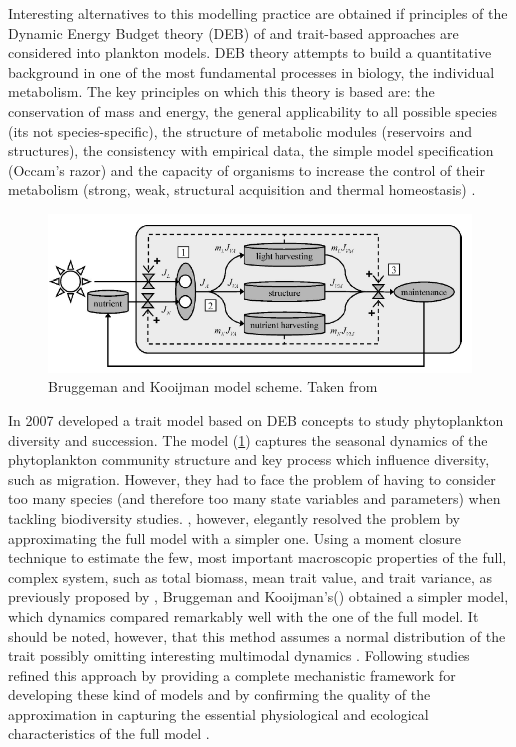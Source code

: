 Interesting alternatives to this modelling practice are obtained if principles of the Dynamic Energy Budget theory (DEB) of \citet{Kooijman2009} and trait-based approaches are considered into plankton models. DEB theory attempts to build a quantitative background in one of the most fundamental processes in biology, the individual metabolism. The key principles on which this theory is based are: the conservation of mass and energy, the general applicability to all possible species (its not species-specific), the structure of metabolic modules (reservoirs and structures), the consistency with empirical data, the simple model specification (Occam's razor) and the capacity of organisms to increase the control of their metabolism (strong, weak, structural acquisition and thermal homeostasis) \citep{Sousa2010}.  

\begin{figure}
\centering
\includegraphics[trim = 0mm 0mm 0mm 0mm, clip, width=1\linewidth]{./Chp3-Further/Bruggeman-2007.png}
\caption[Scheme]{\small {Bruggeman and Kooijman model scheme. Taken from \citet{Bruggeman2007}}}
\label{Bruggeman}
\end{figure}

In 2007 \citet{Bruggeman2007} developed a trait model based on DEB concepts to study phytoplankton diversity and succession. The model (\ref{Bruggeman}) captures the seasonal dynamics of the phytoplankton community structure and key process which influence diversity, such as migration. However, they had to face the problem of having to consider too many species (and therefore too many state variables and parameters) when tackling biodiversity studies. \citet{Bruggeman2007}, however, elegantly resolved the problem by approximating the full model with a simpler one. Using a moment closure technique to estimate the few, most important macroscopic properties of the full, complex system, such as total biomass, mean trait value, and trait variance, as previously proposed by \citet{Wirtz1996, Norberg2001}, Bruggeman and Kooijman's(\citeyear{Bruggeman2007}) obtained a simpler model, which dynamics compared remarkably well with the one of the full model. It should be noted, however, that this method assumes a normal distribution of the trait possibly omitting interesting multimodal dynamics \citep{Bruggeman2007}. Following studies refined this approach by providing a complete mechanistic framework for developing these kind of models and by confirming the quality of the approximation in capturing the essential physiological and ecological characteristics of the full model \citep{Merico2009}. 

